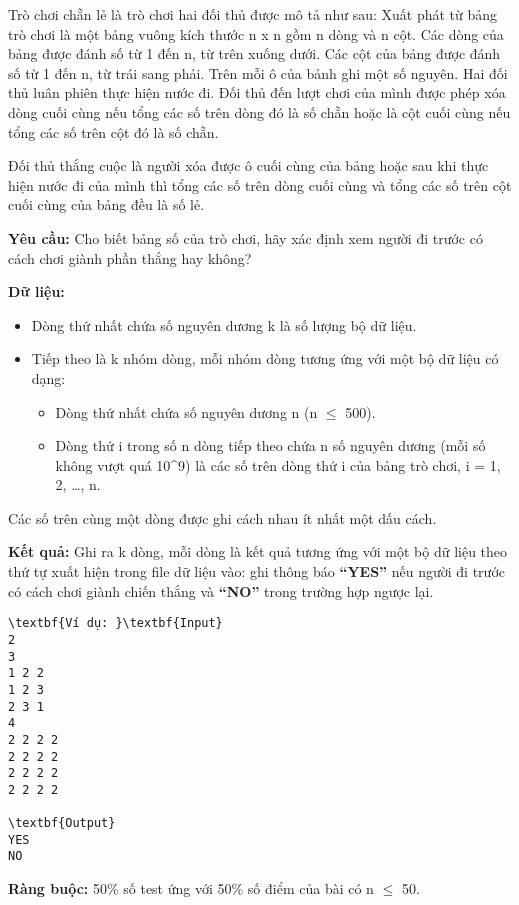 

Trò chơi chẵn lẻ là trò chơi hai đối thủ được mô tả như sau: Xuất phát từ bảng trò chơi là một bảng vuông kích thước n x n gồm n dòng và n cột. Các dòng của bảng được đánh số từ 1 đến n, từ trên xuống dưới. Các cột của bảng được đánh số từ 1 đến n, từ trái sang phải. Trên mỗi ô của bảnh ghi một số nguyên. Hai đối thủ luân phiên thực hiện nước đi. Đối thủ đến lượt chơi của mình được phép xóa dòng cuối cùng nếu tổng các số trên dòng đó là số chẵn hoặc là cột cuối cùng nếu tổng các số trên cột đó là số chẵn.

Đối thủ thắng cuộc là người xóa được ô cuối cùng của bảng hoặc sau khi thực hiện nước đi của mình thì tổng các số trên dòng cuối cùng và tổng các số trên cột cuối cùng của bảng đều là số lẻ.

\textbf{Yêu cầu: } Cho biết bảng số của trò chơi, hãy xác định xem người đi trước có cách chơi giành phần thắng hay không?

\textbf{Dữ liệu: }
\begin{itemize}
	\item Dòng thứ nhất chứa số nguyên dương k là số lượng bộ dữ liệu.
	\item Tiếp theo là k nhóm dòng, mỗi nhóm dòng tương ứng với một bộ dữ liệu có dạng:
\begin{itemize}
	\item Dòng thứ nhất chứa số nguyên dương n (n  $\le$  500).
	\item Dòng thứ i trong số n dòng tiếp theo chứa n số nguyên dương (mỗi số không vượt quá 10^9) là các số trên dòng thứ i của bảng trò chơi, i = 1, 2, …, n.
\end{itemize}
\end{itemize}

Các số trên cùng một dòng được ghi cách nhau ít nhất một dấu cách.

\textbf{Kết quả: } Ghi ra k dòng, mỗi dòng là kết quả tương ứng với một bộ dữ liệu theo thứ tự xuất hiện trong file dữ liệu vào: ghi thông báo \textbf{ “YES” } nếu người đi trước có cách chơi giành chiến thắng và \textbf{ “NO” } trong trường hợp ngược lại.
\begin{verbatim}
\textbf{Ví dụ: }\textbf{Input}
2
3
1 2 2
1 2 3
2 3 1
4
2 2 2 2
2 2 2 2
2 2 2 2
2 2 2 2

\textbf{Output}
YES
NO\end{verbatim}

\textbf{Ràng buộc: } 50\% số test ứng với 50\% số điểm của bài có n  $\le$  50.
